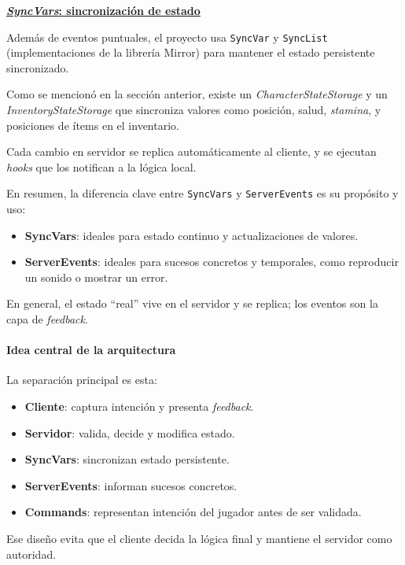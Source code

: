 \vspace{0.15cm}

\textbf{\underline{\textit{SyncVars}: sincronización de estado}}

\vspace{0.15cm}
Además de eventos puntuales, el proyecto usa \texttt{SyncVar} y \texttt{SyncList} (implementaciones de la librería Mirror)
para mantener el estado persistente sincronizado.

\vspace{0.15cm}

Como se mencionó en la sección anterior, existe un \textit{CharacterStateStorage} y un 
\textit{InventoryStateStorage} que sincroniza valores como posición, salud, \textit{stamina}, y posiciones de ítems en el inventario.

Cada cambio en servidor se replica automáticamente al cliente, y se ejecutan \textit{hooks} que los notifican a la lógica local.

\vspace{0.15cm}
En resumen, la diferencia clave entre \texttt{SyncVars} y \texttt{ServerEvents} es su propósito y uso:

\begin{itemize}
    \item \textbf{SyncVars}: ideales para estado continuo y actualizaciones de valores.
    \item \textbf{ServerEvents}: ideales para sucesos concretos y temporales, como reproducir un sonido o 
    mostrar un error.
\end{itemize}
En general, el estado “real” vive en el servidor y se replica; los eventos son la capa de \textit{feedback}.

\paragraph{Idea central de la arquitectura}

La separación principal es esta:
\begin{itemize}
    \item \textbf{Cliente}: captura intención y presenta \textit{feedback}.
    \item \textbf{Servidor}: valida, decide y modifica estado.
    \item \textbf{SyncVars}: sincronizan estado persistente.
    \item \textbf{ServerEvents}: informan sucesos concretos.
    \item \textbf{Commands}: representan intención del jugador antes de ser validada.
\end{itemize}
Ese diseño evita que el cliente decida la lógica final y mantiene el servidor como autoridad.

